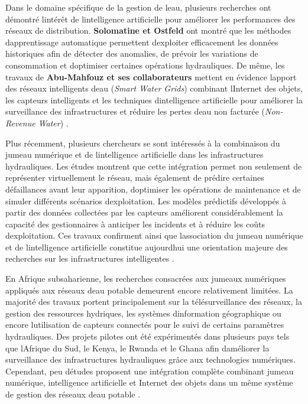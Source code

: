 \documentclass[12pt,a4paper,oneside]{report}
\begin{document}
Dans le domaine spécifique de la gestion de l\textquotesingle eau,
plusieurs recherches ont démontré l\textquotesingle intérêt de
l\textquotesingle intelligence artificielle pour améliorer les
performances des réseaux de distribution. \textbf{Solomatine et Ostfeld}
ont montré que les méthodes d\textquotesingle apprentissage automatique
permettent d\textquotesingle exploiter efficacement les données
historiques afin de détecter des anomalies, de prévoir les variations de
consommation et d\textquotesingle optimiser certaines opérations
hydrauliques. De même, les travaux de \textbf{Abu-Mahfouz et ses
collaborateurs} mettent en évidence l\textquotesingle apport des réseaux
intelligents d\textquotesingle eau (\emph{Smart Water Grids}) combinant
l\textquotesingle Internet des objets, les capteurs intelligents et les
techniques d\textquotesingle intelligence artificielle pour améliorer la
surveillance des infrastructures et réduire les pertes
d\textquotesingle eau non facturée (\emph{Non-Revenue Water}) \cite{ref76}.

Plus récemment, plusieurs chercheurs se sont intéressés à la combinaison
du jumeau numérique et de l\textquotesingle intelligence artificielle
dans les infrastructures hydrauliques. Les études montrent que cette
intégration permet non seulement de représenter virtuellement le réseau,
mais également de prédire certaines défaillances avant leur apparition,
d\textquotesingle optimiser les opérations de maintenance et de simuler
différents scénarios d\textquotesingle exploitation. Les modèles
prédictifs développés à partir des données collectées par les capteurs
améliorent considérablement la capacité des gestionnaires à anticiper
les incidents et à réduire les coûts d\textquotesingle exploitation. Ces
travaux confirment ainsi que l\textquotesingle association du jumeau
numérique et de l\textquotesingle intelligence artificielle constitue
aujourd\textquotesingle hui une orientation majeure des recherches sur
les infrastructures intelligentes \cite{ref61}.

En Afrique subsaharienne, les recherches consacrées aux jumeaux
numériques appliqués aux réseaux d\textquotesingle eau potable demeurent
encore relativement limitées. La majorité des travaux portent
principalement sur la télésurveillance des réseaux, la gestion des
ressources hydriques, les systèmes d\textquotesingle information
géographique ou encore l\textquotesingle utilisation de capteurs
connectés pour le suivi de certains paramètres hydrauliques. Des projets
pilotes ont été expérimentés dans plusieurs pays tels que
l\textquotesingle Afrique du Sud, le Kenya, le Rwanda et le Ghana afin
d\textquotesingle améliorer la surveillance des infrastructures
hydrauliques grâce aux technologies numériques. Cependant, peu
d\textquotesingle études proposent une intégration complète combinant
jumeau numérique, intelligence artificielle et Internet des objets dans
un même système de gestion des réseaux d\textquotesingle eau potable
\cite{ref77}.
\end{document}
